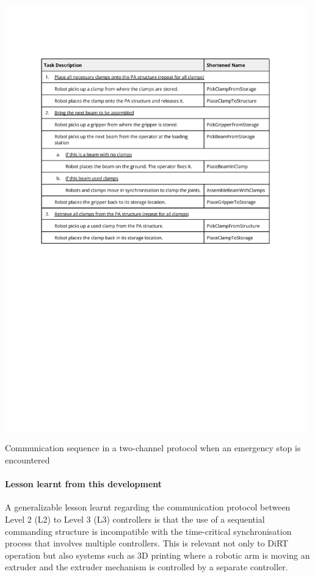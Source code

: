 \begin{table}[!h]
    \includegraphics[page=8, trim=25.4mm 175mm 25.4mm 33mm, clip, width=0.98\textwidth]{tables/Tables in Chapter 6.pdf}
    \caption{Communication sequence in a two-channel protocol when an emergency stop is encountered}
    \label{table:two-channel-communication-protocol-emergency-stop}
\end{table}


\paragraph{Lesson learnt from this development}

A generalizable lesson learnt regarding the communication protocol between Level 2 (L2) to Level 3 (L3) controllers is that the use of a sequential commanding structure is incompatible with the time-critical synchronisation process that involves multiple controllers. This is relevant not only to DiRT operation but also systems such as 3D printing where a robotic arm is moving an extruder and the extruder mechanism is controlled by a separate controller.

